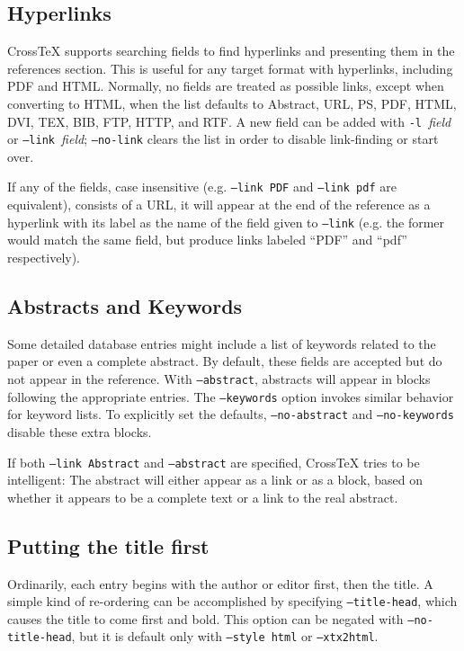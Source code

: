 \documentclass{article}
\newcommand{\XTX}{Cross\TeX}
\begin{document}
\subsection{Hyperlinks}

\XTX{} supports searching fields to find hyperlinks and presenting them
in the references section.  This is useful for any target format with
hyperlinks, including PDF and HTML.  Normally, no fields are treated
as possible links, except when converting to HTML, when the list
defaults to Abstract, URL, PS, PDF, HTML, DVI, TEX, BIB, FTP, HTTP,
and RTF.  A new field can be added with \texttt{-l~}\textit{field} or
\texttt{--link~}\textit{field}; \texttt{--no-link} clears the list in
order to disable link-finding or start over.

If any of the fields, case insensitive (e.g. \texttt{--link~PDF} and
\texttt{--link~pdf} are equivalent), consists of a URL, it will appear
at the end of the reference as a hyperlink with its label as the name
of the field given to \texttt{--link} (e.g. the former would match the
same field, but produce links labeled ``PDF'' and ``pdf'' respectively).

\subsection{Abstracts and Keywords}

Some detailed database entries might include a list of keywords related
to the paper or even a complete abstract.  By default, these fields are
accepted but do not appear in the reference.  With \texttt{--abstract},
abstracts will appear in blocks following the appropriate entries.
The \texttt{--keywords} option invokes similar behavior for keyword
lists.  To explicitly set the defaults, \texttt{--no-abstract} and
\texttt{--no-keywords} disable these extra blocks.

If both \texttt{--link~Abstract} and \texttt{--abstract} are specified,
\XTX{} tries to be intelligent: The abstract will either appear as a
link or as a block, based on whether it appears to be a complete text
or a link to the real abstract.

\subsection{Putting the title first}

Ordinarily, each entry begins with the author or editor first, then the
title.  A simple kind of re-ordering can be accomplished by specifying
\texttt{--title-head}, which causes the title to come first and bold.
This option can be negated with \texttt{--no-title-head}, but it is
default only with \texttt{--style~html} or \texttt{--xtx2html}.
\end{document}
